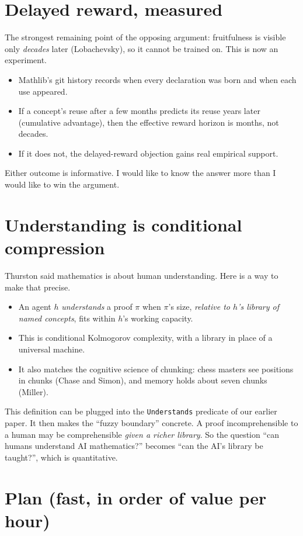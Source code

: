 \documentclass[11pt]{article}
\begin{document}
\section{Delayed reward, measured}

The strongest remaining point of the opposing argument: fruitfulness is visible only
\emph{decades} later (Lobachevsky), so it cannot be trained on. This is now an experiment.
\begin{itemize}
\item Mathlib's git history records when every declaration was born and when each use
  appeared.
\item If a concept's reuse after a few months predicts its reuse years later (cumulative
  advantage), then the effective reward horizon is months, not decades.
\item If it does not, the delayed-reward objection gains real empirical support.
\end{itemize}
Either outcome is informative. I would like to know the answer more than I would like to
win the argument.

\section{Understanding is conditional compression}

Thurston said mathematics is about human understanding. Here is a way to make that precise.
\begin{itemize}
\item An agent $h$ \emph{understands} a proof $\pi$ when $\pi$'s size, \emph{relative to
  $h$'s library of named concepts}, fits within $h$'s working capacity.
\item This is conditional Kolmogorov complexity, with a library in place of a universal
  machine.
\item It also matches the cognitive science of chunking: chess masters see positions in
  chunks (Chase and Simon), and memory holds about seven chunks (Miller).
\end{itemize}

This definition can be plugged into the \texttt{Understands} predicate of our earlier paper.
It then makes the ``fuzzy boundary'' concrete. A proof incomprehensible to a human may be
comprehensible \emph{given a richer library}. So the question ``can humans understand AI
mathematics?'' becomes ``can the AI's library be taught?'', which is quantitative.

\section{Plan (fast, in order of value per hour)}
\end{document}
